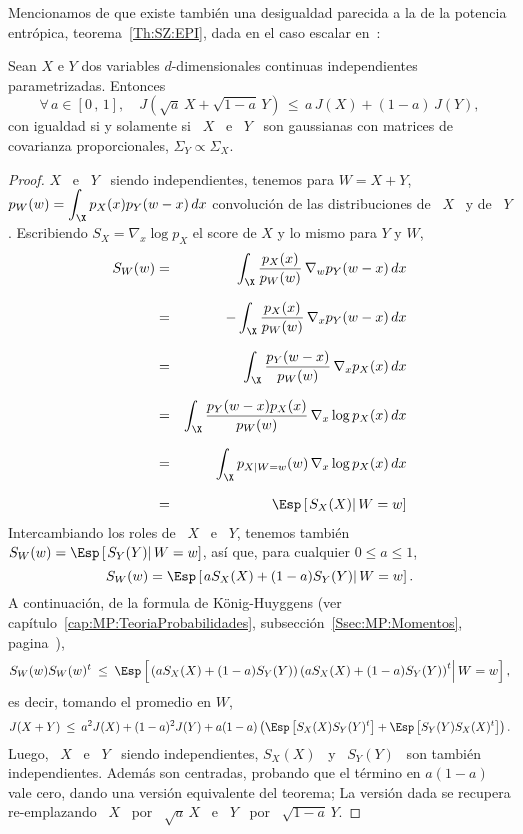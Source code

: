 Mencionamos de que existe tambi\'en una desigualdad parecida a la de la potencia
entr\'opica,  teorema~\ref{Th:SZ:EPI}, dada en  el caso  escalar en~\cite{Joh04,
  Bla65, Zam98, DemCov91, KagYu08}:
%
\begin{teorema}
  Sean  $X$  e  $Y$  dos variables  $d$-dimensionales  continuas  independientes
  parametrizadas.  Entonces
  \[
  \forall \, a \in [0 \, , \,  1], \quad J\left( \sqrt{a} \, X + \sqrt{1-a} \, Y
  \right) \, \le \, a \, J(X) + (1-a) \, J(Y),
  \]
  con igualdad si y  solamente si \ $X$ \ e \ $Y$  \ son gaussianas con matrices
  de covarianza proporcionales, $\Sigma_Y \propto \Sigma_X$.
\end{teorema}
%
\begin{proof}
  $X$  \  e  \  $Y$  \  siendo  independientes,  tenemos  para  $W  =  X  +  Y$,
  $\displaystyle p_W(w)  = \int_\X p_X(x)  p_Y(w-x) \, dx$ convoluci\'on  de las
  distribuciones de  \ $X$  \ y de  \ $Y$  .  Escribiendo $S_X  = \nabla_x \log p_X$ el
  score de $X$ y lo mismo para $Y$ y $W$,
  \begin{eqnarray*}
  S_W(w) & = & \int_\X \frac{p_X(x)}{p_W(w)} \, \nabla_w p_Y(w-x) \, dx\\[2.5mm]
  & = & - \int_\X \frac{p_X(x)}{p_W(w)} \, \nabla_x p_Y(w-x) \, dx\\[2.5mm]
  & = & \int_\X \frac{p_Y(w-x)}{p_W(w)} \, \nabla_x p_X(x) \, dx\\[2.5mm]
  & = & \int_\X \frac{p_Y(w-x) p_X(x)}{p_W(w)} \, \nabla_x \log p_X(x) \, dx\\[2.5mm]
  & = & \int_\X p_{X|W=w}(w) \, \nabla_x \log p_X(x) \, dx\\[2.5mm]
  & = & \Esp\left[ \left. S_X(X) \right| W = w \right]
  \end{eqnarray*}
  Intercambiando  los roles de  \ $X$  \ e  \ $Y$,  tenemos tambi\'en  $S_W(w) =
  \Esp\left[ \left. S_Y(Y) \right| W =  w \right]$, as\'i que, para cualquier $0
  \le a \le 1$,
  \[
  S_W(w) = \Esp\left[ \left. a S_X(X) + (1-a) S_Y(Y) \right| W = w \right].
  \]
  A    continuaci\'on,    de     la    formula    de    K\"onig-Huyggens    (ver
  cap\'itulo~\ref{cap:MP:TeoriaProbabilidades},
  subsecci\'on~\ref{Ssec:MP:Momentos}, pagina~\pageref{Ssec:MP:Momentos}),
  \[
  S_W(w) S_W(w)^t \: \le \:  \Esp\left[ \left. \left(a S_X(X) + (1-a) S_Y(Y)
      \right) \left(a S_X(X) + (1-a) S_Y(Y) \right)^t \right| W = w \right],
  \]
  es decir, tomando el promedio en $W$,
  \[
  J(X+Y) \: \le  \: a^2 J(X) + (1-a)^2 J(Y) +  a (1-a) \left( \Esp\left[
      S_X(X) S_Y(Y)^t \right] + \Esp\left[ S_Y(Y) S_X(X)^t \right] \right).
  \]
  Luego, \ $X$ \ e \ $Y$ \  siendo independientes, $S_X(X)$ \ y \ $S_Y(Y)$ \ son
  tambi\'en independientes. Adem\'as son centradas, probando que el t\'ermino en
  $a  (1-a)$ vale  cero, dando  una  versi\'on equivalente  del teorema;  La
  versi\'on dada se recupera re-emplazando \ $X$ \ por \ $\sqrt{a} \, X$ \ e \
  $Y$ \ por \ $\sqrt{1-a} \, Y$.


\end{proof}
